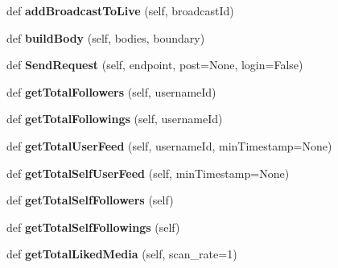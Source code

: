 \begin{DoxyCompactItemize}
def {\bfseries add\+Broadcast\+To\+Live} (self, broadcast\+Id)
\item 
\mbox{\label{class_instagram_a_p_i_1_1_instagram_a_p_i_1_1_instagram_a_p_i_abe4e8b6b239cba6c288291d4aa2267ac}} 
def {\bfseries build\+Body} (self, bodies, boundary)
\item 
\mbox{\label{class_instagram_a_p_i_1_1_instagram_a_p_i_1_1_instagram_a_p_i_aa0889c12587dcc38f7fb75f78fcdd8ce}} 
def {\bfseries Send\+Request} (self, endpoint, post=None, login=False)
\item 
\mbox{\label{class_instagram_a_p_i_1_1_instagram_a_p_i_1_1_instagram_a_p_i_adcb49408841a1abfb098e6be8f9f4266}} 
def {\bfseries get\+Total\+Followers} (self, username\+Id)
\item 
\mbox{\label{class_instagram_a_p_i_1_1_instagram_a_p_i_1_1_instagram_a_p_i_abde7b1f83cd29f7360a7a2051dc908da}} 
def {\bfseries get\+Total\+Followings} (self, username\+Id)
\item 
\mbox{\label{class_instagram_a_p_i_1_1_instagram_a_p_i_1_1_instagram_a_p_i_a897f6cb9f726b049262dd074a0e074fe}} 
def {\bfseries get\+Total\+User\+Feed} (self, username\+Id, min\+Timestamp=None)
\item 
\mbox{\label{class_instagram_a_p_i_1_1_instagram_a_p_i_1_1_instagram_a_p_i_a8349158a97a1ccae2084c852a3fae683}} 
def {\bfseries get\+Total\+Self\+User\+Feed} (self, min\+Timestamp=None)
\item 
\mbox{\label{class_instagram_a_p_i_1_1_instagram_a_p_i_1_1_instagram_a_p_i_a902b10ec8c55f7d1d86f5232dd24c792}} 
def {\bfseries get\+Total\+Self\+Followers} (self)
\item 
\mbox{\label{class_instagram_a_p_i_1_1_instagram_a_p_i_1_1_instagram_a_p_i_ae0a41ce4e62869af8771a208d7fea96f}} 
def {\bfseries get\+Total\+Self\+Followings} (self)
\item 
\mbox{\label{class_instagram_a_p_i_1_1_instagram_a_p_i_1_1_instagram_a_p_i_a47b2e634d9a09e5d848bba2f2b69eee2}} 
def {\bfseries get\+Total\+Liked\+Media} (self, scan\+\_\+rate=1)
\end{DoxyCompactItemize}
